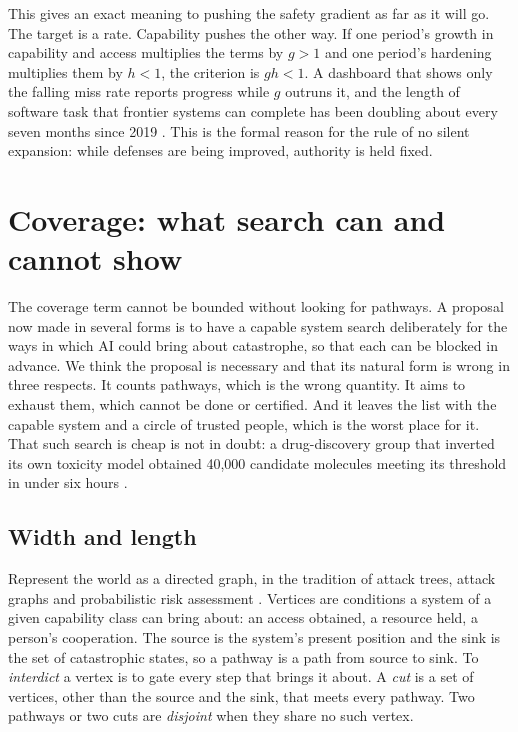 \documentclass[10pt,twocolumn,letterpaper]{article}
\theoremstyle{definition}
\begin{document}
This gives an exact meaning to pushing the safety gradient as far as it will go. The target is a rate. Capability pushes the other way. If one period's growth in capability and access multiplies the terms by $g>1$ and one period's hardening multiplies them by $h<1$, the criterion is $gh<1$. A dashboard that shows only the falling miss rate reports progress while $g$ outruns it, and the length of software task that frontier systems can complete has been doubling about every seven months since 2019 \cite{kwa}. This is the formal reason for the rule of no silent expansion: while defenses are being improved, authority is held fixed.

\section{Coverage: what search can and cannot show}
\label{sec:coverage}

The coverage term cannot be bounded without looking for pathways. A proposal now made in several forms is to have a capable system search deliberately for the ways in which AI could bring about catastrophe, so that each can be blocked in advance. We think the proposal is necessary and that its natural form is wrong in three respects. It counts pathways, which is the wrong quantity. It aims to exhaust them, which cannot be done or certified. And it leaves the list with the capable system and a circle of trusted people, which is the worst place for it. That such search is cheap is not in doubt: a drug-discovery group that inverted its own toxicity model obtained 40,000 candidate molecules meeting its threshold in under six hours \cite{urbina}.

\subsection{Width and length}

Represent the world as a directed graph, in the tradition of attack trees, attack graphs and probabilistic risk assessment \cite{schneier,sheyner,wash}. Vertices are conditions a system of a given capability class can bring about: an access obtained, a resource held, a person's cooperation. The source is the system's present position and the sink is the set of catastrophic states, so a pathway is a path from source to sink. To \emph{interdict} a vertex is to gate every step that brings it about. A \emph{cut} is a set of vertices, other than the source and the sink, that meets every pathway. Two pathways or two cuts are \emph{disjoint} when they share no such vertex.
\end{document}
